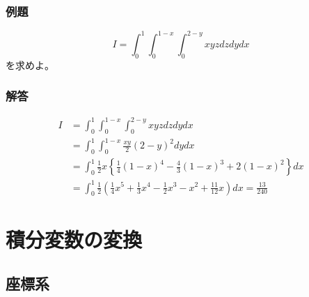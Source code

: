 \documentclass[a4j,dvipdfmx]{jsarticle}
\begin{document}
\subsubsection*{例題}
\begin{equation*}
    I=\int_0^1\int_0^{1-x}\int_0^{2-y}xyzdzdydx
\end{equation*}
を求めよ。

\subsubsection*{解答}
\begin{align*}
    I&=\int_0^1\int_0^{1-x}\int_0^{2-y}xyzdzdydx\\
     &=\int_0^1\int_0^{1-x}\frac{xy}{2}(2-y)^2dydx\\
     &=\int_0^1\frac{1}{2}x\left\{\frac{1}{4}(1-x)^4-\frac{4}{3}(1-x)^3+2(1-x)^2\right\}dx\\
     &=\int_0^1\frac{1}{2}\left(\frac{1}{4}x^5+\frac{1}{3}x^4-\frac{1}{2}x^3-x^2+\frac{11}{12}x\right)dx=\frac{13}{240}
\end{align*}

\section{積分変数の変換}
\subsection{座標系}
\end{document}
